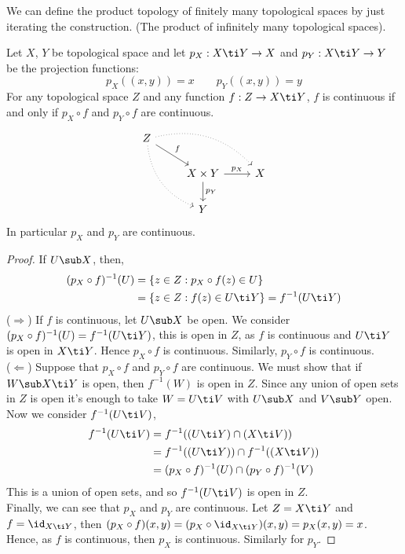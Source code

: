 \begin{remark}
   We can define the product topology of finitely many topological spaces by just iterating the construction. (The product of infinitely many topological spaces).
\end{remark}

\begin{nlemma}
  Let $X$, $Y$ be topological space and let $p_X : X \ti Y \to X$ and $p_Y : X \ti Y \to Y$ be the projection functions:
  $$ p_X((x, y)) = x \qquad p_Y((x, y)) = y $$
  For any topological space $Z$ and any function $f : Z \to X \ti Y$, $f$ is continuous if and only if $p_X \circ f$ and $p_Y \circ f$ are continuous.
    \[\begin{tikzcd}
  	Z \\
  	& {X\times Y} & X \\
  	& Y
  	\arrow["f", from=1-1, to=2-2]
  	\arrow["{p_X}", from=2-2, to=2-3]
  	\arrow["{p_Y}", from=2-2, to=3-2]
  	\arrow[bend left, dotted, from=1-1, to=2-3]
  	\arrow[bend right, dotted, from=1-1, to=3-2]
  \end{tikzcd}\]
  In particular $p_X$ and $p_Y$ are continuous.
\end{nlemma}
\begin{proof}
  If $U \sub X$, then,
  \begin{align*}
    (p_X\circ f)^{-1}(U) &= \{z \in Z : p_X\circ f(z) \in U\} \\
    &= \{z \in Z : f(z) \in U \ti Y\} = f^{-1}(U \ti Y)
  \end{align*}
  ($\Longrightarrow$) If $f$ is continuous, let $U \sub X$ be open. We consider $(p_X \circ f)^{-1}(U) = f^{-1}(U \ti Y)$, this is open in $Z$, as $f$ is continuous and $U \ti Y$ is open in $X \ti Y$. Hence $p_X \circ f$ is continuous. Similarly, $p_Y \circ f$ is continuous.\\

  \noindent
  ($\Longleftarrow$) Suppose that $p_X \circ f$ and $p_Y \circ f$ are continuous. We must show that if $W \sub X\ti Y$ is open, then $f^{-1}(W)$ is open in $Z$. Since any union of open sets in $Z$ is open it's enough to take $W = U \ti V$ with $U \sub X$ and $V \sub Y$ open. Now we consider $f^{-1}(U \ti V)$,
  \begin{align*}
    f^{-1}(U \ti V) &= f^{-1}((U \ti Y) \cap (X \ti V))\\
    &= f^{-1}((U \ti Y)) \cap f^{-1}((X \ti V))\\
    &= (p_X \circ f)^{-1}(U) \cap (p_Y \circ f)^{-1}(V)
  \end{align*}
  This is a union of open sets, and so $f^{-1}(U \ti V)$ is open in $Z$.\\

  \noindent
  Finally, we can see that $p_X$ and $p_Y$ are continuous. Let $Z = X \ti Y$ and $f = \id_{X\ti Y}$, then $(p_X \circ f) (x, y) = (p_X \circ \id_{X \ti Y})(x, y) = p_X(x, y) = x$. Hence, as $f$ is continuous, then $p_X$ is continuous. Similarly for $p_Y$.
\end{proof}